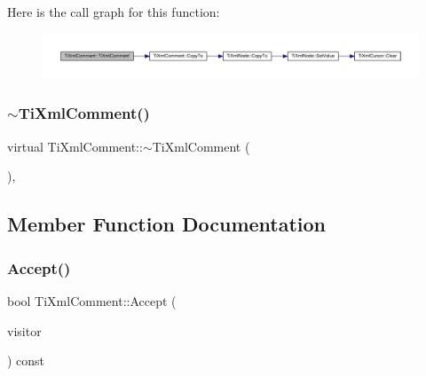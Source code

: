 Here is the call graph for this function\+:
\nopagebreak
\begin{figure}[H]
\begin{center}
\leavevmode
\includegraphics[width=350pt]{class_ti_xml_comment_afaec41ac2760ce946ba1590eb5708e50_cgraph}
\end{center}
\end{figure}
\mbox{\label{class_ti_xml_comment_a3264ae2e9c4a127edfa03289bb2c9aa2}} 
\subsubsection{\texorpdfstring{$\sim$\+Ti\+Xml\+Comment()}{~TiXmlComment()}}
{\footnotesize\ttfamily virtual Ti\+Xml\+Comment\+::$\sim$\+Ti\+Xml\+Comment (\begin{DoxyParamCaption}{ }\end{DoxyParamCaption})\hspace{0.3cm}{\ttfamily [inline]}, {\ttfamily [virtual]}}



\subsection{Member Function Documentation}
\mbox{\label{class_ti_xml_comment_ac894241530d1d266131a5026cb251a95}} 
\subsubsection{\texorpdfstring{Accept()}{Accept()}}
{\footnotesize\ttfamily bool Ti\+Xml\+Comment\+::\+Accept (\begin{DoxyParamCaption}\item[{\hyperlink{class_ti_xml_visitor}{Ti\+Xml\+Visitor} $\ast$}]{visitor }\end{DoxyParamCaption}) const\hspace{0.3cm}{\ttfamily [virtual]}}

